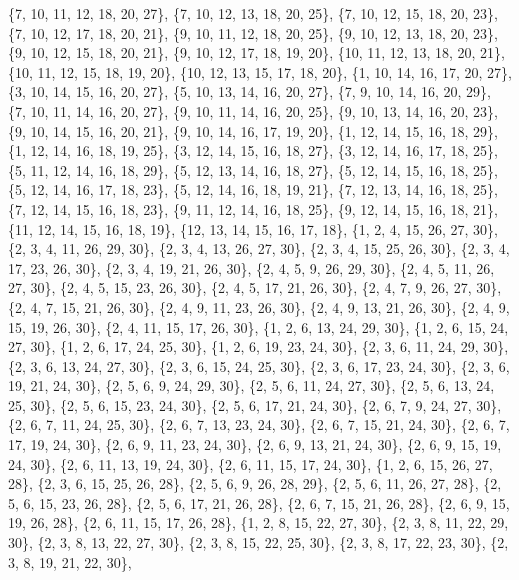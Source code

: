 \documentclass[11pt,a4paper]{article}
\begin{document}
{\{7, 10, 11, 12, 18, 20, 27\}, \{7, 10, 12, 13, 18, 20, 25\}, \{7, 10, 12, 15, 18, 20, 23\}, \{7, 10, 12, 17, 18, 20, 21\}, \{9, 10, 11, 12, 18, 20, 25\},
\{9, 10, 12, 13, 18, 20, 23\}, \{9, 10, 12, 15, 18, 20, 21\}, \{9, 10, 12, 17, 18, 19, 20\}, \{10, 11, 12, 13, 18, 20, 21\}, \{10, 11, 12, 15, 18, 19, 20\},
\{10, 12, 13, 15, 17, 18, 20\}, \{1, 10, 14, 16, 17, 20, 27\}, \{3, 10, 14, 15, 16, 20, 27\}, \{5, 10, 13, 14, 16, 20, 27\}, \{7, 9, 10, 14, 16, 20, 29\},
\{7, 10, 11, 14, 16, 20, 27\}, \{9, 10, 11, 14, 16, 20, 25\}, \{9, 10, 13, 14, 16, 20, 23\}, \{9, 10, 14, 15, 16, 20, 21\}, \{9, 10, 14, 16, 17, 19, 20\},
\{1, 12, 14, 15, 16, 18, 29\}, \{1, 12, 14, 16, 18, 19, 25\}, \{3, 12, 14, 15, 16, 18, 27\}, \{3, 12, 14, 16, 17, 18, 25\}, \{5, 11, 12, 14, 16, 18, 29\},
\{5, 12, 13, 14, 16, 18, 27\}, \{5, 12, 14, 15, 16, 18, 25\}, \{5, 12, 14, 16, 17, 18, 23\}, \{5, 12, 14, 16, 18, 19, 21\}, \{7, 12, 13, 14, 16, 18, 25\},
\{7, 12, 14, 15, 16, 18, 23\}, \{9, 11, 12, 14, 16, 18, 25\}, \{9, 12, 14, 15, 16, 18, 21\}, \{11, 12, 14, 15, 16, 18, 19\}, \{12, 13, 14, 15, 16, 17, 18\},
\{1, 2, 4, 15, 26, 27, 30\}, \{2, 3, 4, 11, 26, 29, 30\}, \{2, 3, 4, 13, 26, 27, 30\}, \{2, 3, 4, 15, 25, 26, 30\}, \{2, 3, 4, 17, 23, 26, 30\},
\{2, 3, 4, 19, 21, 26, 30\}, \{2, 4, 5, 9, 26, 29, 30\}, \{2, 4, 5, 11, 26, 27, 30\}, \{2, 4, 5, 15, 23, 26, 30\}, \{2, 4, 5, 17, 21, 26, 30\},
\{2, 4, 7, 9, 26, 27, 30\}, \{2, 4, 7, 15, 21, 26, 30\}, \{2, 4, 9, 11, 23, 26, 30\}, \{2, 4, 9, 13, 21, 26, 30\}, \{2, 4, 9, 15, 19, 26, 30\},
\{2, 4, 11, 15, 17, 26, 30\}, \{1, 2, 6, 13, 24, 29, 30\}, \{1, 2, 6, 15, 24, 27, 30\}, \{1, 2, 6, 17, 24, 25, 30\}, \{1, 2, 6, 19, 23, 24, 30\},
\{2, 3, 6, 11, 24, 29, 30\}, \{2, 3, 6, 13, 24, 27, 30\}, \{2, 3, 6, 15, 24, 25, 30\}, \{2, 3, 6, 17, 23, 24, 30\}, \{2, 3, 6, 19, 21, 24, 30\},
\{2, 5, 6, 9, 24, 29, 30\}, \{2, 5, 6, 11, 24, 27, 30\}, \{2, 5, 6, 13, 24, 25, 30\}, \{2, 5, 6, 15, 23, 24, 30\}, \{2, 5, 6, 17, 21, 24, 30\},
\{2, 6, 7, 9, 24, 27, 30\}, \{2, 6, 7, 11, 24, 25, 30\}, \{2, 6, 7, 13, 23, 24, 30\}, \{2, 6, 7, 15, 21, 24, 30\}, \{2, 6, 7, 17, 19, 24, 30\},
\{2, 6, 9, 11, 23, 24, 30\}, \{2, 6, 9, 13, 21, 24, 30\}, \{2, 6, 9, 15, 19, 24, 30\}, \{2, 6, 11, 13, 19, 24, 30\}, \{2, 6, 11, 15, 17, 24, 30\},
\{1, 2, 6, 15, 26, 27, 28\}, \{2, 3, 6, 15, 25, 26, 28\}, \{2, 5, 6, 9, 26, 28, 29\}, \{2, 5, 6, 11, 26, 27, 28\}, \{2, 5, 6, 15, 23, 26, 28\},
\{2, 5, 6, 17, 21, 26, 28\}, \{2, 6, 7, 15, 21, 26, 28\}, \{2, 6, 9, 15, 19, 26, 28\}, \{2, 6, 11, 15, 17, 26, 28\}, \{1, 2, 8, 15, 22, 27, 30\},
\{2, 3, 8, 11, 22, 29, 30\}, \{2, 3, 8, 13, 22, 27, 30\}, \{2, 3, 8, 15, 22, 25, 30\}, \{2, 3, 8, 17, 22, 23, 30\}, \{2, 3, 8, 19, 21, 22, 30\},
}
\end{document}
